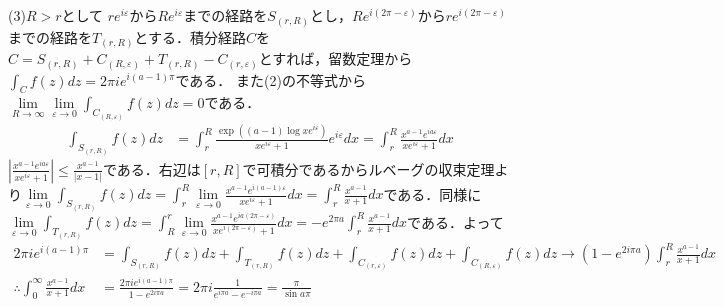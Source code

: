 \documentclass[
		book,
		head_space=20mm,
		foot_space=20mm,
		gutter=10mm,
		line_length=190mm
]{jlreq}
\begin{document}
(3)$R>r$として
$re^{i\varepsilon}$から$Re^{i\varepsilon}$までの経路を$S_{(r,R)}$とし，$Re^{i(2\pi-\varepsilon)}$から$re^{i(2\pi-\varepsilon)}$までの経路を$T_{(r,R)}$とする．積分経路$C$を$C=S_{(r,R)}+C_{(R,\varepsilon)}+T_{(r,R)}-C_{(r,\varepsilon)}$とすれば，留数定理から$\int_C f(z)dz=2\pi i e^{i(a-1)\pi}$である．
また(2)の不等式から$\lim\limits_{R\to\infty}\lim\limits_{\varepsilon\to 0}\int_{C_{(R,\varepsilon)}} f(z)dz = 0 $である．
\begin{align}
    \int_{S_{(r,R)}} f(z)dz &= \int_r^R \frac{\exp((a-1)\log xe^{i\varepsilon})}{xe^{i\varepsilon}+1}e^{i\varepsilon}dx = \int_r^R \frac{x^{a-1}e^{ia\varepsilon}}{xe^{i\varepsilon}+1}dx
\end{align}
$\left|  \frac{x^{a-1}e^{ia\varepsilon}}{xe^{i\varepsilon}+1} \right|\le \frac{x^{a-1}}{|x-1|}$である．右辺は$[r,R]$で可積分であるからルベーグの収束定理より$\lim\limits_{\varepsilon\to 0}\int_{S_{(r,R)}} f(z)dz = \int_r^R \lim\limits_{\varepsilon\to 0} \frac{x^{a-1}e^{i(a-1)\varepsilon}}{xe^{i\varepsilon}+1}dx=\int_r^R \frac{x^{a-1}}{x+1}dx$である．同様に
$\lim\limits_{\varepsilon\to 0}\int_{T_{(r,R)}} f(z)dz =\int_R^r \lim\limits_{\varepsilon\to 0} \frac{x^{a-1}e^{ia(2\pi-\varepsilon)}}{xe^{i(2\pi-\varepsilon)}+1}dx=-e^{2\pi a}\int_r^R \frac{x^{a-1}}{x+1}dx$である．よって
\begin{align}
    2\pi i e^{i(a-1)\pi}&=\int_{S_{(r,R)}} f(z)dz + \int_{T_{(r,R)}} f(z)dz + \int_{C_{(r,\varepsilon)}} f(z)dz + \int_{C_{(R,\varepsilon)}} f(z)dz \rightarrow (1-e^{2i\pi a})\int_r^R \frac{x^{a-1}}{x+1}dx \\
    \therefore \int_0^\infty \frac{x^{a-1}}{x+1}dx&= \frac{2\pi i e^{i(a-1)\pi}}{1-e^{2i\pi a}}=2\pi i \frac{1}{e^{i\pi a}-e^{-i\pi a}}=\frac{\pi}{\sin a\pi}
\end{align}
\end{document}
